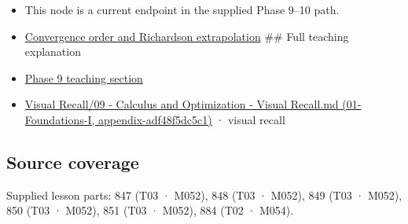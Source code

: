 \begin{itemize}
\item
  This node is a current endpoint in the supplied Phase 9--10 path.
\item
  \hyperref[appendix-aca80b6bf17a]{Convergence order and Richardson extrapolation} \#\# Full teaching explanation
\item
  \hyperref[02-foundations-ii-ch022-numerical-differentiation-and-automatic-differentiation]{Phase 9 teaching section}
\item
  \href{../01-Foundations-I/main.pdf\#nameddest=appendix-adf48f5dc5c1}{Visual Recall/09 - Calculus and Optimization - Visual Recall.md (01-Foundations-I, appendix-adf48f5dc5c1)} · visual recall
\end{itemize}

\subsection{Source coverage}\label{appendix-e2d7b4f2161d-source-coverage}

Supplied lesson parts: 847 (T03 · M052), 848 (T03 · M052), 849 (T03 · M052), 850 (T03 · M052), 851 (T03 · M052), 884 (T02 · M054).
